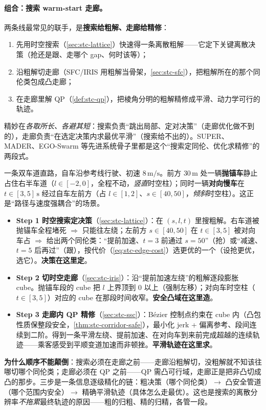 \paragraph{组合：搜索 warm-start 走廊。}
两条线最常见的联手，是\textbf{搜索给粗解、走廊给精修}：
\begin{enumerate}
  \item 先用时空搜索（\cref{sec:stc-lattice}）快速得一条离散粗解——它定下关键离散决策（抢还是跟、走哪个 gap、何时该等）；
  \item 沿粗解切走廊（SFC/IRIS 用粗解当骨架，\cref{sec:stc-sfc}），把粗解所在的那个同伦类包成凸走廊；
  \item 在走廊里解 QP（\cref{def:stc-qp}），把棱角分明的粗解精修成平滑、动力学可行的轨迹。
\end{enumerate}
精妙在\emph{各取所长、各避其短}：搜索负责“跳出局部、定对决策”（走廊优化做不到的），走廊负责“在选定决策内求最优平滑”（搜索给不出的）。SUPER\cite{ren2025super}、MADER、EGO-Swarm 等先进系统骨子里都是这个“搜索定同伦、优化求精修”的两段式。

\begin{example}[动态绕障管线走查]\label{ex:stc-pipeline}
一条双车道直路，自车沿参考线行驶、初速 $8\,\mathrm{m/s}$。前方 $30\,\mathrm{m}$ 处一辆\textbf{抛锚车}静止占住右半车道（$l\in[-2,0]$，全程不动，\emph{竖直}时空柱）；同时一辆\textbf{对向慢车}在 $t\in[3,5]\,\mathrm{s}$ 经过自车左前方（占 $l\in[1,2]$、$s\in[40,50]$，\emph{倾斜}时空柱）。这正是“路径与速度强耦合”的场景。
\begin{itemize}
  \item \textbf{Step 1 时空搜索定决策}（\cref{sec:stc-lattice}）：在 $(s,l,t)$ 里搜粗解。右车道被抛锚车全程堵死 $\Rightarrow$ 只能往左绕；左前方 $s\in[40,50]$ 在 $t\in[3,5]$ 被对向车占 $\Rightarrow$ 给出两个同伦类：“提前加速、$t{=}3$ 前通过 $s{=}50$”（抢）或“减速、$t{=}5$ 后再过”（跟），按代价（\cref{eq:stc-edge-cost}）选更优的一个（设抢更优，选它）。\textbf{决策在这里定}。
  \item \textbf{Step 2 切时空走廊}（\cref{sec:stc-iris}）：沿“提前加速左绕”的粗解逐段膨胀 cube。抛锚车段的 cube 把 $l$ 上界顶到 $0$ 以上（强制左移）；对向车时空柱（$t\in[3,5]$）对应的 cube 在那段时间收窄。\textbf{安全凸域在这里造}。
  \item \textbf{Step 3 走廊内 QP 精修}（\cref{sec:stc-ssc}）：Bézier 控制点约束在 cube 内（凸包性质保整段安全，\cref{thm:stc-corridor-safe}），最小化 jerk + 偏离参考、段间连续到二阶。得到一条平滑左绕、提前加速、在对向车到来前完成超越的连续轨迹——乘客感受到平顺变道加速而非顿挫。\textbf{平滑轨迹在这里求}。
\end{itemize}
\textbf{为什么顺序不能颠倒}：搜索必须在走廊之前——走廊沿粗解切，没粗解就不知该往哪切哪个同伦类；走廊必须在 QP 之前——QP 需凸可行域，走廊正是把非凸切成凸的那步。三步是一条信息逐级精化的链：粗决策（哪个同伦类）$\to$ 凸安全管道（哪个范围内安全）$\to$ 精确平滑轨迹（具体怎么走最优）。这也是搜索的离散分辨率\emph{不拖累}最终轨迹的原因——粗的归粗、精的归精，各管一段。
\end{example}

